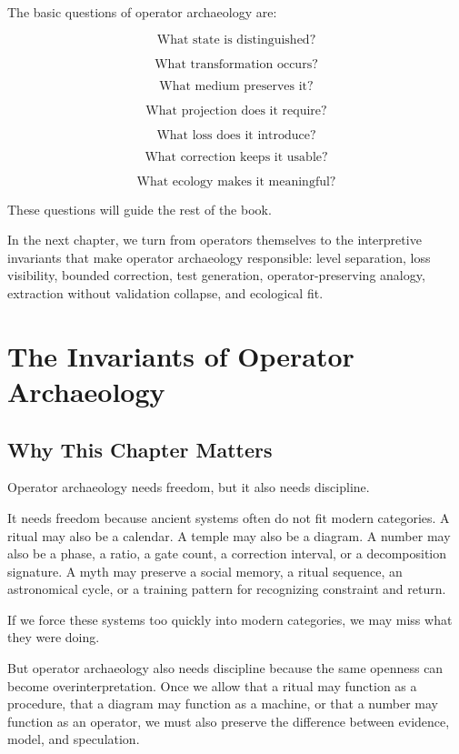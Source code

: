 \documentclass[11pt]{book}
\begin{document}
The basic questions of operator archaeology are:

\[
\text{What state is distinguished?}
\]

\[
\text{What transformation occurs?}
\]

\[
\text{What medium preserves it?}
\]

\[
\text{What projection does it require?}
\]

\[
\text{What loss does it introduce?}
\]

\[
\text{What correction keeps it usable?}
\]

\[
\text{What ecology makes it meaningful?}
\]

These questions will guide the rest of the book.

In the next chapter, we turn from operators themselves to the interpretive invariants that make operator archaeology responsible: level separation, loss visibility, bounded correction, test generation, operator-preserving analogy, extraction without validation collapse, and ecological fit.

\chapter{The Invariants of Operator Archaeology}

\section{Why This Chapter Matters}

Operator archaeology needs freedom, but it also needs discipline.

It needs freedom because ancient systems often do not fit modern categories. A ritual may also be a calendar. A temple may also be a diagram. A number may also be a phase, a ratio, a gate count, a correction interval, or a decomposition signature. A myth may preserve a social memory, a ritual sequence, an astronomical cycle, or a training pattern for recognizing constraint and return.

If we force these systems too quickly into modern categories, we may miss what they were doing.

But operator archaeology also needs discipline because the same openness can become overinterpretation. Once we allow that a ritual may function as a procedure, that a diagram may function as a machine, or that a number may function as an operator, we must also preserve the difference between evidence, model, and speculation.
\end{document}
